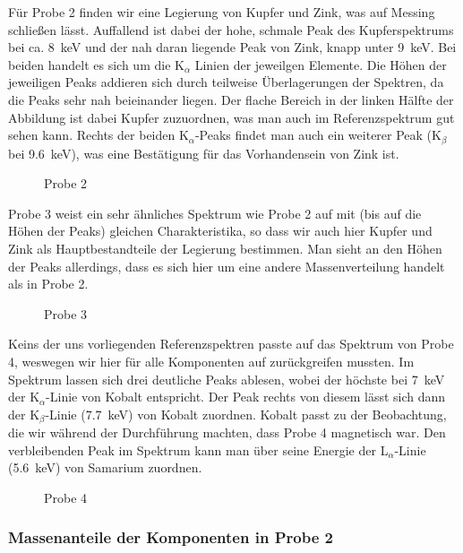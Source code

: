 \documentclass[11pt, a4paper]{article}
\begin{document}
Für Probe 2 finden wir eine Legierung von Kupfer und Zink, was auf Messing schließen lässt.
Auffallend ist dabei der hohe, schmale Peak des Kupferspektrums bei ca. \SI{8}{\kilo\electronvolt} und der nah daran liegende Peak von Zink, knapp unter \SI{9}{\kilo\electronvolt}.
Bei beiden handelt es sich um die K$_{\alpha}$ Linien der jeweilgen Elemente.
Die Höhen der jeweiligen Peaks addieren sich durch teilweise Überlagerungen der Spektren, da die Peaks sehr nah beieinander liegen.
Der flache Bereich in der linken Hälfte der Abbildung ist dabei Kupfer zuzuordnen, was man auch im Referenzspektrum gut sehen kann.
Rechts der beiden K$_{\alpha}$-Peaks findet man auch ein weiterer Peak (K$_{\beta}$ bei \SI{9.6}{\kilo\electronvolt}), was eine Bestätigung für das Vorhandensein von Zink ist.

\begin{figure}[!h]
\centering

\caption{Probe 2}
\label{fig:probe2}
\end{figure}

Probe 3 weist ein sehr ähnliches Spektrum wie Probe 2 auf mit (bis auf die Höhen der Peaks) gleichen Charakteristika, so dass wir auch hier Kupfer und Zink als Hauptbestandteile der Legierung bestimmen.
Man sieht an den Höhen der Peaks allerdings, dass es sich hier um eine andere Massenverteilung handelt als in Probe 2.

\begin{figure}[!h]
\centering

\caption{Probe 3}
\label{fig:probe3}
\end{figure}

Keins der uns vorliegenden Referenzspektren passte auf das Spektrum von Probe 4, weswegen wir hier für alle Komponenten auf \cite{booklet} zurückgreifen mussten.
Im Spektrum lassen sich drei deutliche Peaks ablesen, wobei der höchste bei \SI{7}{\kilo\electronvolt} der K$_{\alpha}$-Linie von Kobalt entspricht.
Der Peak rechts von diesem lässt sich dann der K$_{\beta}$-Linie (\SI{7.7}{\kilo\electronvolt}) von Kobalt zuordnen.
Kobalt passt zu der Beobachtung, die wir während der Durchführung machten, dass Probe 4 magnetisch war.
Den verbleibenden Peak im Spektrum kann man über seine Energie der L$_{\alpha}$-Linie (\SI{5.6}{\kilo\electronvolt}) von Samarium zuordnen. 

\begin{figure}[!h]
\centering

\caption{Probe 4}
\label{fig:probe4}
\end{figure}

\subsubsection{Massenanteile der Komponenten in Probe 2}
\end{document}
